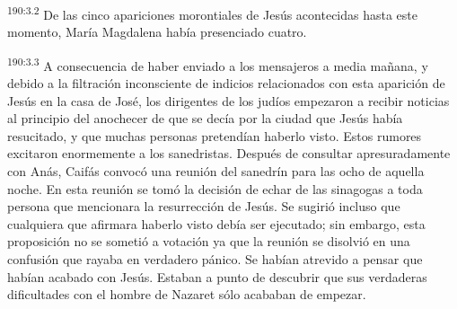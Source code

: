 \par
\textsuperscript{190:3.2} De las cinco apariciones morontiales de Jesús acontecidas hasta este momento, María Magdalena había presenciado cuatro.

\par
\textsuperscript{190:3.3} A consecuencia de haber enviado a los mensajeros a media mañana, y debido a la filtración inconsciente de indicios relacionados con esta aparición de Jesús en la casa de José, los dirigentes de los judíos empezaron a recibir noticias al principio del anochecer de que se decía por la ciudad que Jesús había resucitado, y que muchas personas pretendían haberlo visto. Estos rumores excitaron enormemente a los sanedristas. Después de consultar apresuradamente con Anás, Caifás convocó una reunión del sanedrín para las ocho de aquella noche. En esta reunión se tomó la decisión de echar de las sinagogas a toda persona que mencionara la resurrección de Jesús. Se sugirió incluso que cualquiera que afirmara haberlo visto debía ser ejecutado; sin embargo, esta proposición no se sometió a votación ya que la reunión se disolvió en una confusión que rayaba en verdadero pánico. Se habían atrevido a pensar que habían acabado con Jesús. Estaban a punto de descubrir que sus verdaderas dificultades con el hombre de Nazaret sólo acababan de empezar.

